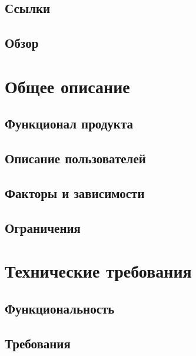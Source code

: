 \documentclass{article}
\begin{document}
  \subsection{Ссылки}
  

  \subsection{Обзор}
  

\section{Общее описание}

  \subsection{Функционал продукта}
  

  \subsection{Описание пользователей}
  

  \subsection{Факторы и зависимости}
  

  \subsection{Ограничения}
  

\section{Технические требования}

  \subsection{Функциональность}
  

  \subsection{Требования}
  
\end{document}
